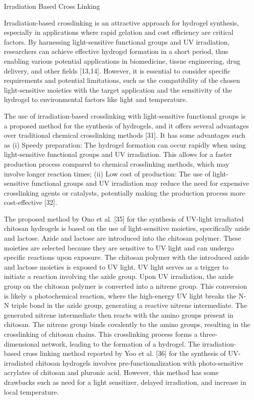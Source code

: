 \documentclass[../../main-notes.tex]{subfiles}
\begin{document}
Irradiation Based Cross Linking

Irradiation-based crosslinking is an attractive approach for hydrogel synthesis, especially in applications where rapid gelation and cost efficiency are critical factors. 
By harnessing light-sensitive functional groups and UV irradiation, researchers can achieve effective hydrogel formation in a short period, thus enabling various potential applications in biomedicine, tissue engineering, drug delivery, and other fields [13,14]. 
However, it is essential to consider specific requirements and potential limitations, such as the compatibility of the chosen light-sensitive moieties with the target application and the sensitivity of the hydrogel to environmental factors like light and temperature. 

The use of irradiation-based crosslinking with light-sensitive functional groups is a proposed method for the synthesis of hydrogels, and it offers several advantages over traditional chemical crosslinking methods [31]. 
It has some advantages such as 
    (i) Speedy preparation: The hydrogel formation can occur rapidly when using light-sensitive functional groups and UV irradiation. This allows for a faster production process compared to chemical crosslinking methods, which may involve longer reaction times; 
    (ii) Low cost of production: The use of light-sensitive functional groups and UV irradiation may reduce the need for expensive crosslinking agents or catalysts, potentially making the production process more cost-effective [32]. 

The proposed method by Ono et al. [35] for the synthesis of UV-light irradiated chitosan hydrogels is based on the use of light-sensitive moieties, specifically azide and lactose. 
Azide and lactose are introduced into the chitosan polymer. 
These moieties are selected because they are sensitive to UV light and can undergo specific reactions upon exposure. 
The chitosan polymer with the introduced azide and lactose moieties is exposed to UV light. 
UV light serves as a trigger to initiate a reaction involving the azide group. 
Upon UV irradiation, the azide group on the chitosan polymer is converted into a nitrene group. 
This conversion is likely a photochemical reaction, where the high-energy UV light breaks the N-N triple bond in the azide group, generating a reactive nitrene intermediate. 
The generated nitrene intermediate then reacts with the amino groups present in chitosan. 
The nitrene group binds covalently to the amino groups, resulting in the crosslinking of chitosan chains. 
This crosslinking process forms a three-dimensional network, leading to the formation of a hydrogel. 
The irradiation-based cross linking method reported by Yoo et al. [36] for the synthesis of UV-irradiated chitosan hydrogels involves pre-functionalization with photo-sensitive acrylates of chitosan and pluronic acid. 
However, this method has some drawbacks such as need for a light sensitizer, delayed irradiation, and increase in local temperature.
\end{document}
